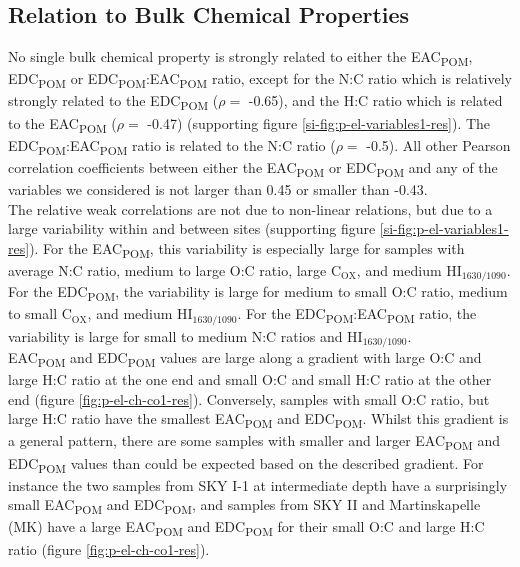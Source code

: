\documentclass[draft,linenumbers]{agujournal2018}
\begin{document}
\subsection{Relation to Bulk Chemical Properties}

No single bulk chemical property is strongly related to either the
EAC\textsubscript{POM}, EDC\textsubscript{POM} or
EDC\textsubscript{POM}:EAC\textsubscript{POM} ratio, except for the N:C
ratio which is relatively strongly related to the EDC\textsubscript{POM}
(\(\rho=\) -0.65), and the H:C ratio which is related to the
EAC\textsubscript{POM} (\(\rho=\) -0.47) (supporting figure
\ref{si-fig:p-el-variables1-res}). The
EDC\textsubscript{POM}:EAC\textsubscript{POM} ratio is related to the
N:C ratio (\(\rho=\) -0.5). All other Pearson correlation coefficients
between either the EAC\textsubscript{POM} or EDC\textsubscript{POM} and
any of the variables we considered is not larger than 0.45 or smaller
than -0.43.\\
The relative weak correlations are not due to non-linear relations, but
due to a large variability within and between sites (supporting figure
\ref{si-fig:p-el-variables1-res}). For the EAC\textsubscript{POM}, this
variability is especially large for samples with average N:C ratio,
medium to large O:C ratio, large C\(_\text{OX}\), and medium
HI\(_\text{1630/1090}\). For the EDC\textsubscript{POM}, the variability
is large for medium to small O:C ratio, medium to small C\(_\text{OX}\),
and medium HI\(_\text{1630/1090}\). For the
EDC\textsubscript{POM}:EAC\textsubscript{POM} ratio, the variability is
large for small to medium N:C ratios and HI\(_\text{1630/1090}\).\\
EAC\textsubscript{POM} and EDC\textsubscript{POM} values are large along
a gradient with large O:C and large H:C ratio at the one end and small
O:C and small H:C ratio at the other end (figure
\ref{fig:p-el-ch-co1-res}). Conversely, samples with small O:C ratio,
but large H:C ratio have the smallest EAC\textsubscript{POM} and
EDC\textsubscript{POM}. Whilst this gradient is a general pattern, there
are some samples with smaller and larger EAC\textsubscript{POM} and
EDC\textsubscript{POM} values than could be expected based on the
described gradient. For instance the two samples from SKY I-1 at
intermediate depth have a surprisingly small EAC\textsubscript{POM} and
EDC\textsubscript{POM}, and samples from SKY II and Martinskapelle (MK)
have a large EAC\textsubscript{POM} and EDC\textsubscript{POM} for their
small O:C and large H:C ratio (figure \ref{fig:p-el-ch-co1-res}).\\
\end{document}
